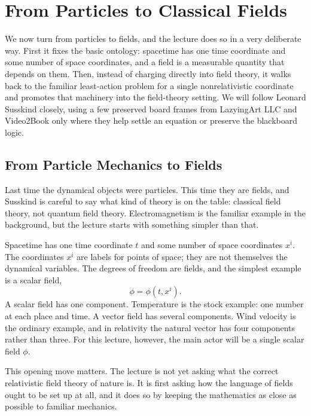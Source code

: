 \chapter{From Particles to Classical Fields}

We now turn from particles to fields, and the lecture does so in a very deliberate way. First it fixes the basic ontology: spacetime has one time coordinate and some number of space coordinates, and a field is a measurable quantity that depends on them. Then, instead of charging directly into field theory, it walks back to the familiar least-action problem for a single nonrelativistic coordinate and promotes that machinery into the field-theory setting. We will follow Leonard Susskind closely, using a few preserved board frames from LazyingArt LLC and Video2Book only where they help settle an equation or preserve the blackboard logic.

\section{From Particle Mechanics to Fields}

Last time the dynamical objects were particles. This time they are fields, and Susskind is careful to say what kind of theory is on the table: classical field theory, not quantum field theory. Electromagnetism is the familiar example in the background, but the lecture starts with something simpler than that.

Spacetime has one time coordinate \(t\) and some number of space coordinates \(x^i\). The coordinates \(x^i\) are labels for points of space; they are not themselves the dynamical variables. The degrees of freedom are fields, and the simplest example is a scalar field,
\begin{equation}
\phi=\phi(t,x^i).
\end{equation}
A scalar field has one component. Temperature is the stock example: one number at each place and time. A vector field has several components. Wind velocity is the ordinary example, and in relativity the natural vector has four components rather than three. For this lecture, however, the main actor will be a single scalar field \(\phi\).

This opening move matters. The lecture is not yet asking what the correct relativistic field theory of nature is. It is first asking how the language of fields ought to be set up at all, and it does so by keeping the mathematics as close as possible to familiar mechanics.


